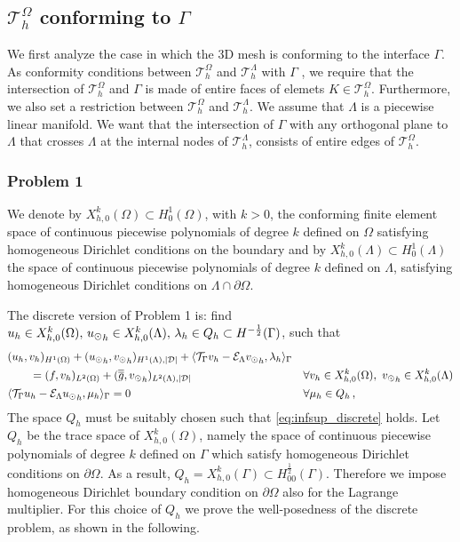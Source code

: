 \subsection{$\mathcal{T}^{\Omega}_h$ conforming to $\Gamma$}
 We first analyze the case in which the 3D mesh is conforming to the interface $\Gamma$. As conformity conditions between $\mathcal{T}^{\Omega}_h$ and $\mathcal{T}^{\Lambda}_h$ with $\Gamma$ , we require that the intersection of $\mathcal{T}^{\Omega}_h$ and $\Gamma$ is made of entire faces of elemets $K \in \mathcal{T}^{\Omega}_h$. Furthermore, we also set a restriction between $\mathcal{T}^{\Omega}_h$ and $\mathcal{T}^{\Lambda}_h$. We assume that $\Lambda$ is a piecewise linear manifold. We want that the intersection of $\Gamma$ with any orthogonal plane to $\Lambda$ that crosses $\Lambda$ at the internal nodes of $\mathcal{T}^{\Lambda}_h$, consists of entire edges of $\mathcal{T}^{\Omega}_h$. 
 
\subsubsection{Problem 1}
We denote by $X_{h,0}^k(\Omega)\subset H^1_0(\Omega)$, with $k>0$, the conforming finite element space of continuous piecewise polynomials of degree $k$ defined on $\Omega$ satisfying homogeneous Dirichlet conditions on the boundary and by $X_{h,0}^k(\Lambda)\subset H^1_0(\Lambda)$ the space of continuous piecewise polynomials of degree $k$ defined on $\Lambda$, satisfying homogeneous Dirichlet conditions on $\Lambda \cap \partial \Omega$. 

The discrete version of Problem 1 is:
find $u_h \in X_{h,0}^k (\Omega) ,\, {u_{\odot}}_h \in X_{h,0}^k(\Lambda) ,\, \lambda_h \in Q_h \subset H^{-\frac12}(\Gamma )$, such that
\begin{subequations}
\begin{align}
&(u_h,v_h)_{H^1(\Omega)} + ({u_{\odot}}_h,{v_{\odot}}_h)_{H^1(\Lambda),|\mathcal{D}|} 
+ \langle {\mathcal{T}_\Gamma} v_h  - \mathcal{E}_{\Lambda} {v_{\odot}}_h, \lambda_h \rangle_\Gamma &&
\\
\nonumber
&\qquad= (f,v_h)_{L^2(\Omega)} + (\overline{\overline{g}},{v_{\odot}}_h)_{L^2(\Lambda),|\mathcal{D}|}
\quad && \forall v_h \in X_{h,0}^k(\Omega), \ {v_{\odot}}_h \in X_{h,0}^k(\Lambda)
\\
&   \langle {\mathcal{T}_\Gamma} u_h - \mathcal{E}_{\Lambda} {u_{\odot}}_h , \mu_h \rangle_\Gamma = 0
\quad && \forall \mu_h \in Q_h\,,
\end{align}
\end{subequations}
The space $Q_h$ must be suitably chosen such that \eqref{eq:infsup_discrete} holds. Let $Q_h$ be the trace space of $X_{h,0}^k(\Omega)$, namely the space of continuous piecewise polynomials of degree $k$ defined on $\Gamma$ which satisfy homogeneous Dirichlet conditions on $\partial \Omega$. As a result, $Q_h=X_{h,0}^k(\Gamma) \subset H^\frac12_{00}(\Gamma)$. Therefore we impose homogeneous Dirichlet boundary condition on $\partial \Omega$ also for the Lagrange multiplier. For this choice of $Q_h$ we prove the well-posedness of the discrete problem, as shown in the following. 

